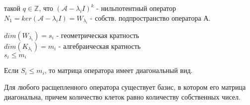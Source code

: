 такой $q\in\mathbb Z$, что $(\mathcal A-\lambda_iI)^k$ - нильпотентный 
оператор\\
$N_1=ker(\mathcal A-\lambda_iI)=W_{\lambda_i}$ - собств. подпространство 
оператора А.\\
\begin{defin}
$dim(W_{\lambda_i})=s_i$ - геометрическая кратность\\
$dim(K_{\lambda_i})=m_i$ - алгебраическая кратность\\
$s_i\leqslant m_i$
\end{defin}
Если $S_i\leqslant m_i$, то матрица оператора имеет диагональный вид. 
\begin{theor}
Для любого расщепленного оператора существует базис, в котором его матрица
диагональна, причем количество клеток равно количеству собственных чисел.
\end{theor}




